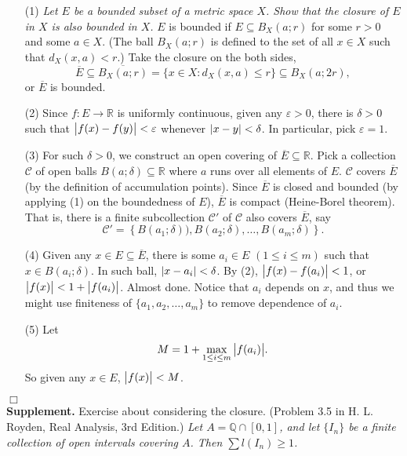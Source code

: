 \documentclass{article}
\begin{document}
\begin{enumerate}
\item[(1)]
\emph{Let $E$ be a bounded subset of a metric space $X$.
Show that the closure of $E$ in $X$ is also bounded in $X$.}
$E$ is bounded if $E \subseteq B_X(a;r)$ for some $r > 0$ and some $a \in X$.
(The ball $B_X(a;r)$ is defined to the set of all $x \in X$ such that
$d_X(x, a) < r$.)
Take the closure on the both sides,
$$\overline{E}
\subseteq \overline{B_X(a;r)}
= \{ x \in X : d_X(x, a) \leq r \}
\subseteq B_X(a;2r),$$
or $\overline{E}$ is bounded.

\item[(2)]
Since $f: E \to \mathbb{R}$ is uniformly continuous,
given any $\varepsilon > 0$, there is $\delta > 0$ such that
$\abs{f(x) - f(y)} < \varepsilon$ whenever $\abs{x - y} < \delta$.
In particular, pick $\varepsilon = 1$.

\item[(3)]
For such $\delta > 0$, we construct an open covering of $\overline{E} \subseteq \mathbb{R}$.
Pick a collection $\mathscr{C}$ of open balls
$B(a;\delta) \subseteq \mathbb{R}$
where $a$ runs over all elements of $E$.
$\mathscr{C}$ covers $\overline{E}$ (by the definition of accumulation points).
Since $\overline{E} $ is closed and bounded
(by applying (1) on the boundedness of $E$),
$\overline{E}$ is compact
(Heine-Borel theorem).
That is, there is a finite subcollection $\mathscr{C}'$ of $\mathscr{C}$
also covers $\overline{E}$, say
$$\mathscr{C}'
= \left\{B(a_1;\delta)), B(a_2;\delta), \ldots, B(a_m;\delta) \right\}.$$

\item[(4)]
Given any $x \in E \subseteq \overline{E}$,
there is some $a_i \in E$ $(1 \leq i \leq m)$ such that $x \in B(a_i;\delta)$.
In such ball, $\abs{x - a_i} < \delta$.
By (2), $\abs{f(x) - f(a_i)} < 1$,
or $\abs{f(x)} < 1 + \abs{f(a_i)}$.
Almost done.
Notice that $a_i$ depends on $x$,
and thus we might use finiteness of $\{ a_1, a_2, \ldots, a_m \}$
to remove dependence of $a_i$.

\item[(5)]
Let
$$M = 1 + \max_{1 \leq i \leq m}{\abs{f(a_i)}}.$$
So given any $x \in E$, $\abs{f(x)} < M$.
\end{enumerate}
$\Box$ \\



\textbf{Supplement.}
Exercise about considering the closure.
(Problem 3.5 in H. L. Royden, Real Analysis, 3rd Edition.)
\emph{Let $A = \mathbb{Q} \cap [0,1]$,
and let $\{ I_n\}$ be a finite collection of open intervals covering $A$.
Then $\sum l(I_n) \geq 1$.} \\
\end{document}
